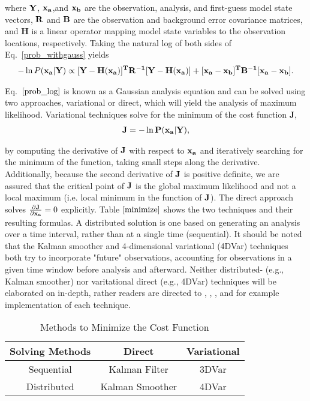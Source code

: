 \documentclass{ttuthes2007}
\begin{document}
where $\bf{Y}$, $\bf{x_a}$,and $\bf{x_b}$ are the observation, analysis, and first-guess model state vectors, $\bf{R}$ and $\bf{B}$ are the observation and background error covariance matrices, and $\mathbf{H}$ is a linear operator mapping model state variables to the observation locations, respectively. Taking the natural log of both sides of Eq.~\ref{prob_withgauss} yields
\begin{align}\label{prob_log}
	-\ln P(\bf{x_a} | \bf{Y}) \propto [\bf{Y}-H(\bf{x_a})]^T \bf{R}^{-1} [\bf{Y}-H(\bf{x_a})] + [\bf{x_a} - \bf{x_b}]^T \bf{B}^{-1} [\bf{x_a} - \bf{x_b}].
\end{align}

Eq.~$\ref{prob_log}$ is known as a Gaussian analysis equation and can be solved using two approaches, variational or direct, which will yield the analysis of maximum likelihood. Variational techniques solve for the minimum of the cost function $\mathbf{J}$, 
\begin{align}\label{J}
	\bf{J} = -\ln P(\bf{x_a} | \bf{Y}),
\end{align}

by computing the derivative of $\bf{J}$ with respect to $\bf{x_a}$ and iteratively searching for the minimum of the function, taking small steps along the derivative. Additionally, because the second derivative of $\bf{J}$ is positive definite, we are assured that the critical point of $\bf{J}$ is the global maximum likelihood and not a local maximum (i.e. local minimum in the function of $\bf{J}$). The direct approach solves $\frac{\partial \bf{J}}{\partial \bf{x_a}} = 0$ explicitly. Table $\ref{minimize}$ shows the two techniques and their resulting formulas. A distributed solution is one based on generating an analysis over a time interval, rather than at a single time (sequential). It should be noted that the Kalman smoother and 4-dimensional variational (4DVar) techniques both try to incorporate "future" observations, accounting for observations in a given time window before analysis and afterward. Neither distributed- (e.g., Kalman smoother) nor varitational direct (e.g., 4DVar) techniques will be elaborated on in-depth, rather readers are directed to \cite{Sasaki1970}, \cite{Thepautetal1993}, \cite{Cohnetal1994}, and \cite{Lorenc2003} for example implementation of each technique. \\

\begin{table}[t] 
\caption{Methods to Minimize the Cost Function} 
\centering %
\begin{tabular}{c c c} %
\\ [0.5ex] \hline
Solving Methods & Direct & Variational \\ [0.5ex] %
\hline %
Sequential & Kalman Filter & 3DVar  \\ %
Distributed & Kalman Smoother & 4DVar  \\ [1ex] %
\hline %
\end{tabular} 
\label{minimize} %
\end{table} 
\end{document}
